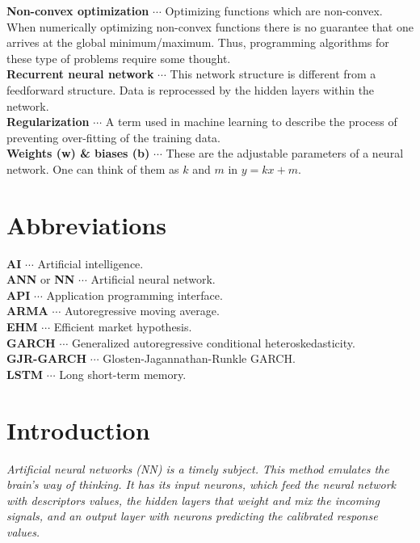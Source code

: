\documentclass[12pt, letterpaper]{amsart}%
\begin{document}
\noindent
\textbf{Non-convex optimization} $\cdots$ Optimizing functions which are non-convex. When numerically optimizing non-convex functions there is no guarantee that one arrives at the global minimum/maximum. Thus, programming algorithms for these type of problems require some thought.
\\

\noindent
\textbf{Recurrent neural network} $\cdots$ This network structure is different from a feedforward structure. Data is reprocessed by the hidden layers within the network.
\\

\noindent
\textbf{Regularization} $\cdots$ A term used in machine learning to describe the process of preventing over-fitting of the training data.
\\

\noindent
\textbf{Weights (w) \& biases (b)} $\cdots$ These are the adjustable parameters of a neural network. One can think of them as $k$ and $m$ in $y = kx+m$.

\newpage

\section*{Abbreviations}
\noindent
\textbf{AI} $\cdots$ Artificial intelligence.
\\

\noindent
\textbf{ANN} or \textbf{NN} $\cdots$ Artificial neural network.
\\

\noindent
\textbf{API} $\cdots$ Application programming interface.
\\

\noindent
\textbf{ARMA} $\cdots$ Autoregressive moving average.
\\

\noindent
\textbf{EHM} $\cdots$ Efficient market hypothesis.
\\

\noindent
\textbf{GARCH} $\cdots$ Generalized autoregressive conditional heteroskedasticity.
\\

\noindent
\textbf{GJR-GARCH} $\cdots$ Glosten-Jagannathan-Runkle GARCH.
\\

\noindent
\textbf{LSTM} $\cdots$ Long short-term memory.

\newpage

\section{Introduction}
\begin{displayquote}
\textit{Artificial neural networks (NN) is a timely subject. This method emulates the brain's way of thinking. It has its input neurons, which feed the neural network with descriptors values, the hidden layers that weight and mix the incoming signals, and an output layer with neurons predicting the calibrated response values.}
\end{displayquote}
\vspace{0.5cm}
\end{document}
